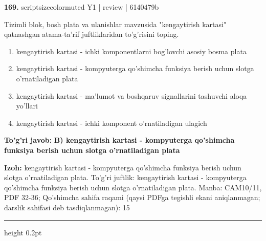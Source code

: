 \documentclass[10pt,a4paper]{article}
\begin{document}
{\bfseries\sffamily\color{ink} 169.} {scriptsizecolor{muted} Y1 | review | 6140479b}
\par
Tizimli blok, bosh plata va ulanishlar mavzusida "kengaytirish kartasi" qatnashgan atama-ta'rif juftliklaridan to'g'risini toping.
\begin{enumerate}[label=\Alph*),leftmargin=9mm]
\item kengaytirish kartasi - ichki komponentlarni bog'lovchi asosiy bosma plata
\item kengaytirish kartasi - kompyuterga qo'shimcha funksiya berish uchun slotga o'rnatiladigan plata
\item kengaytirish kartasi - ma'lumot va boshqaruv signallarini tashuvchi aloqa yo'llari
\item kengaytirish kartasi - ichki komponent o'rnatiladigan ulagich
\end{enumerate}
\begin{tcolorbox}[enhanced,breakable,colback=teal!4,colframe=teal!60!black,boxrule=0.45pt,arc=1.2mm,left=2.7mm,right=2.7mm,top=1.8mm,bottom=1.8mm,before skip=2mm,after skip=2mm]
{\bfseries\sffamily\color{teal}To'g'ri javob:} \textbf{B) kengaytirish kartasi - kompyuterga qo'shimcha funksiya berish uchun slotga o'rnatiladigan plata}
\par\smallskip
{\bfseries Izoh:} kengaytirish kartasi - kompyuterga qo'shimcha funksiya berish uchun slotga o'rnatiladigan plata. To'g'ri juftlik: kengaytirish kartasi - kompyuterga qo'shimcha funksiya berish uchun slotga o'rnatiladigan plata. Manba: CAM10/11, PDF 32-36; Qo'shimcha sahifa raqami (qaysi PDFga tegishli ekani aniqlanmagan; darslik sahifasi deb tasdiqlanmagan): 15
\end{tcolorbox}
\vspace{2mm}\hrule height 0.2pt\vspace{3mm}
\end{document}
